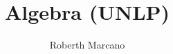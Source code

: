 \documentclass[a4paper,12pt]{book}
\begin{document}
	
	\author{Roberth Marcano}
	\title{Algebra (UNLP)}
	
	\maketitle
	\tableofcontents
	
	
	
	\backmatter
	
\end{document}
